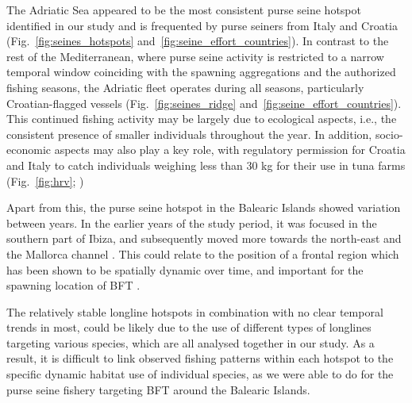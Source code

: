 \medskip

The Adriatic Sea appeared to be the most consistent purse seine hotspot identified in our study and
is frequented by purse seiners from Italy and Croatia (Fig.~\ref{fig:seines_hotspots}
and~\ref{fig:seine_effort_countries}). In contrast to the rest of the Mediterranean, where purse
seine activity is restricted to a narrow temporal window coinciding with the spawning aggregations
and the authorized fishing seasons, the Adriatic fleet operates during all seasons, particularly
Croatian-flagged vessels (Fig.~\ref{fig:seines_ridge} and~\ref{fig:seine_effort_countries}). This
continued fishing activity may be largely due to ecological aspects, i.e., the consistent presence
of smaller individuals throughout the year. In addition, socio-economic aspects may also play a key
role, with regulatory permission for Croatia and Italy to catch individuals weighing less than 30
kg for their use in tuna farms (Fig.~\ref{fig:hrv}; \citealp{hrv_farms})

\medskip

Apart from this, the purse seine hotspot in the Balearic Islands showed variation between years. In
the earlier years of the study period, it was focused in the southern part of Ibiza, and
subsequently moved more towards the north-east and the Mallorca channel .
This could relate to the position of a frontal region which has been shown to be spatially dynamic
over time, and important for the spawning location of BFT \citep{balbin_14,reglero_12}.

\medskip

The relatively stable longline hotspots in combination with no clear temporal trends in most, could
be likely due to the use of different types of longlines targeting various species, which are all
analysed together in our study. As a result, it is difficult to link observed fishing patterns
within each hotspot to the specific dynamic habitat use of individual species, as we were able to
do for the purse seine fishery targeting BFT around the Balearic Islands.

\medskip

